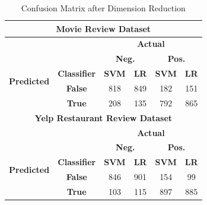\documentclass[10pt, conference]{IEEEtran}
\begin{document}
	\begin{table}[H]
		\caption{Confusion Matrix after Dimension Reduction}
		\begin{center}
		\begin{tabular}{|*{6}{c|}}
			    \hline
			    \multicolumn{6}{|c|}{\textbf{Movie Review Dataset}}\\
				\hline
				\multicolumn{2}{|c|}{\textbf{}} & \multicolumn{4}{|c|}{\textbf{Actual}}\\
				\hline
				\multirow{4}{*}{\begin{sideways}\textbf{Predicted}\end{sideways}} & & \multicolumn{2}{|c|}{\textbf{Neg.}} & \multicolumn{2}{|c|}{\textbf{Pos.}}\\
				\cline{2-6}
				& \textbf{Classifier} & \textbf{SVM} & \textbf{LR} & \textbf{SVM} & \textbf{LR}\\  \cline{2-6}
				& \textbf{False} & 818 & 849 & 182 & 151\\
				\cline{2-6}
				& \textbf{True} & 208 & 135 & 792 & 865\\
				\hline
				\hline
			    \multicolumn{6}{|c|}{\textbf{Yelp Restaurant Review Dataset}}\\
				\hline
				\multicolumn{2}{|c|}{\textbf{}} & \multicolumn{4}{|c|}{\textbf{Actual}}\\
				\hline
				\multirow{4}{*}{\begin{sideways}\textbf{Predicted}\end{sideways}} & & \multicolumn{2}{|c|}{\textbf{Neg.}} & \multicolumn{2}{|c|}{\textbf{Pos.}}\\
				\cline{2-6}
				& \textbf{Classifier} & \textbf{SVM} & \textbf{LR} & \textbf{SVM} & \textbf{LR}\\  \cline{2-6}
				& \textbf{False} & 846 & 901 & 154 & 99\\
				\cline{2-6}
				& \textbf{True} & 103 & 115 & 897 & 885\\
				\hline
			\end{tabular}
			\label{table:cmdr}
		\end{center}
	\end{table}
	
\end{document}

